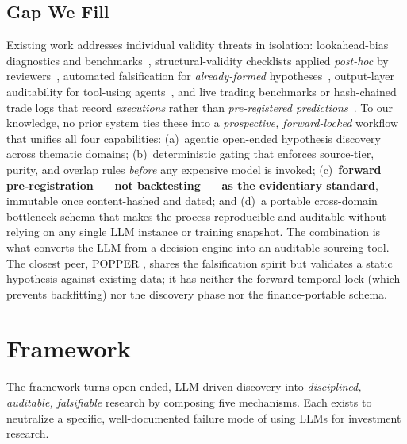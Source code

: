 \documentclass[11pt]{article}
\begin{document}
\subsection*{Gap We Fill}

Existing work addresses individual validity threats in isolation: lookahead-bias
diagnostics and benchmarks~\citep{gao2025lookaheadbias,benhenda2026lookaheadbench},
structural-validity checklists applied \emph{post-hoc} by
reviewers~\citep{kong2026evaluating}, automated falsification for
\emph{already-formed} hypotheses~\citep{huang2025popper}, output-layer
auditability for tool-using agents~\citep{khatchadourian2026replayable}, and
live trading benchmarks or hash-chained trade logs that record
\emph{executions} rather than \emph{pre-registered
predictions}~\citep{qian2025whenagents,chen2025stockbench,45ck2025llmquant}.
To our knowledge, no prior system ties these into a \emph{prospective,
forward-locked} workflow that unifies all four capabilities: (a)~agentic
open-ended hypothesis discovery across thematic domains; (b)~deterministic
gating that enforces source-tier, purity, and overlap rules \emph{before} any
expensive model is invoked; (c)~\textbf{forward pre-registration --- not
backtesting --- as the evidentiary standard}, immutable once content-hashed and
dated; and (d)~a portable cross-domain bottleneck schema that makes the process
reproducible and auditable without relying on any single LLM instance or
training snapshot. The combination is what converts the LLM from a decision
engine into an auditable sourcing tool. The closest peer, POPPER
\citep{huang2025popper}, shares the falsification spirit but validates a static
hypothesis against existing data; it has neither the forward temporal lock
(which prevents backfitting) nor the discovery phase nor the
finance-portable schema.

\section{Framework}

The framework turns open-ended, LLM-driven discovery into \emph{disciplined, auditable, falsifiable}
research by composing five mechanisms. Each exists to neutralize a specific, well-documented
failure mode of using LLMs for investment research.
\end{document}
